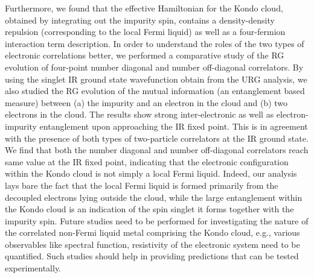 \documentclass[aps,prb,preprint,groupedaddress]{revtex4-2}
\begin{document}
Furthermore, we found that the effective Hamiltonian for the Kondo cloud, obtained by integrating out the impurity spin, contains a density-density repulsion (corresponding to the local Fermi liquid) as well as a four-fermion interaction term  description. In order to understand the roles of the two types of electronic correlations better, we performed a comparative study of the RG evolution of four-point number diagonal and number off-diagonal correlators. By using the singlet IR ground state wavefunction obtain from the URG analysis, we also studied the RG evolution of the mutual information (an entanglement based measure) between (a) the impurity and an electron in the cloud and (b) two electrons in the cloud. The results show strong inter-electronic as well as electron-impurity entanglement upon approaching the IR fixed point. This is in agreement with the presence of both types of two-particle correlators at the IR ground state. We find that both the number diagonal and number off-diagonal correlators reach same value at the IR fixed point, indicating that the electronic configuration within the Kondo cloud is not simply a local Fermi liquid. Indeed, our analysis lays bare the fact that the local Fermi liquid is formed primarily from the decoupled electrons lying outside the cloud, while the large entanglement within the Kondo cloud is an indication of the spin singlet it forms together with the impurity spin. 
Future studies need to be performed for investigating the nature of the correlated non-Fermi liquid metal comprising the Kondo cloud, e.g., various observables like  spectral function, resistivity of the electronic system need to be quantified. Such studies should help in providing predictions that can be tested experimentally. 
\end{document}
